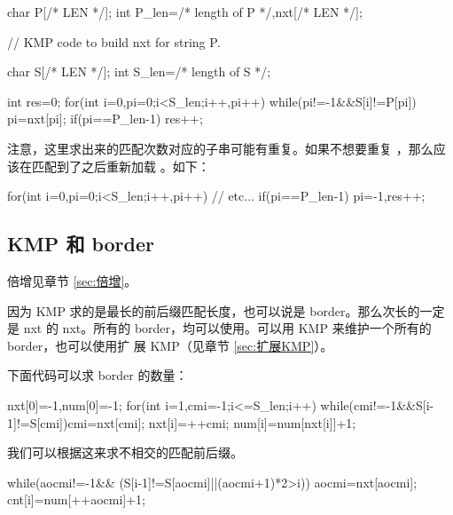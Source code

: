 \begin{Cpp}
{
  char P[/* LEN */];
  int P_len=/* length of P */,nxt[/* LEN */];

  // KMP code to build nxt for string P.

  char S[/* LEN */];
  int S_len=/* length of S */;

  int res=0;
  for(int i=0,pi=0;i<S_len;i++,pi++){
    while(pi!=-1&&S[i]!=P[pi]){
      pi=nxt[pi];
    }
    if(pi==P_len-1) res++;
  }
}
\end{Cpp}

注意，这里求出来的匹配次数对应的子串可能有重复。如果不想要重复
，那么应该在匹配到了之后重新加载 。如下：
\begin{Cpp}
{
  for(int i=0,pi=0;i<S_len;i++,pi++){
    // etc...
    if(pi==P_len-1) pi=-1,res++;
  }
}
\end{Cpp}

\subsection{KMP 和 border}
倍增见章节 \ref{sec:倍增}。

因为 KMP 求的是最长的前后缀匹配长度，也可以说是 border。那么次长的一定是 nxt 的
nxt。所有的 border，均可以使用。可以用 KMP 来维护一个所有的 border，也可以使用扩
展 KMP（见章节 \ref{sec:扩展KMP}）。

下面代码可以求 border 的数量：
\begin{Cpp}
nxt[0]=-1,num[0]=-1;
for(int i=1,cmi=-1;i<=S_len;i++){
  while(cmi!=-1&&S[i-1]!=S[cmi])cmi=nxt[cmi];
  nxt[i]=++cmi;
  num[i]=num[nxt[i]]+1;
}
\end{Cpp}

我们可以根据这来求不相交的匹配前后缀。
\begin{Cpp}
{
   while(aocmi!=-1&&
       (S[i-1]!=S[aocmi]||(aocmi+1)*2>i))
     aocmi=nxt[aocmi];
   cnt[i]=num[++aocmi]+1;
}
\end{Cpp}

